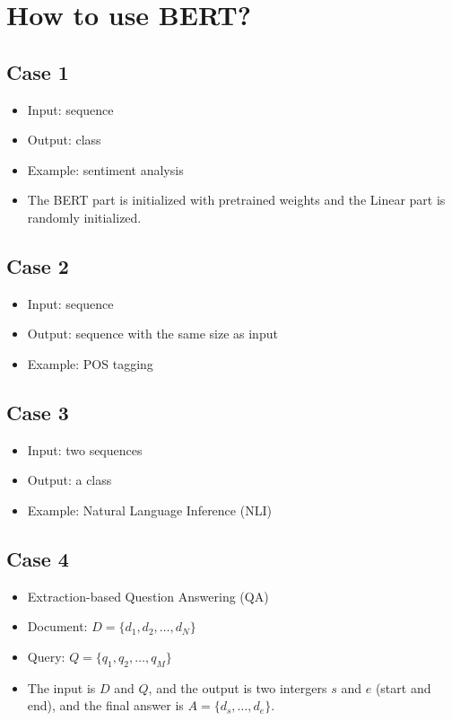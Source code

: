 \documentclass[11pt]{book}
\begin{document}
\section{How to use BERT?}
\subsection*{Case 1}
\begin{itemize}
    \item Input: sequence
    \item Output: class
    \item Example: sentiment analysis
    \item The BERT part is initialized with pretrained weights and the Linear part is randomly initialized.
\end{itemize}
\subsection*{Case 2}
\begin{itemize}
    \item Input: sequence
    \item Output: sequence with the same size as input
    \item Example: POS tagging
\end{itemize}
\subsection*{Case 3}
\begin{itemize}
    \item Input: two sequences
    \item Output: a class
    \item Example: Natural Language Inference (NLI)
\end{itemize}
\subsection*{Case 4}
\begin{itemize}
    \item Extraction-based Question Answering (QA)
    \item Document: $D=\{d_1,d_2,\dots,d_N\}$
    \item Query: $Q=\{q_1,q_2,\dots,q_M\}$
    \item The input is $D$ and $Q$, and the output is two intergers $s$ and $e$ (start and end), and the final answer is $A=\{d_s,\dots,d_e\}$.
\end{itemize}
\end{document}
